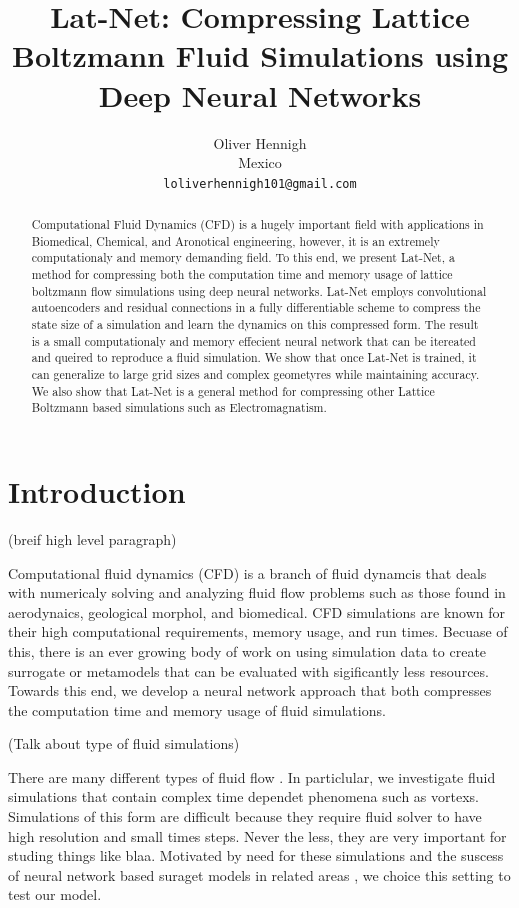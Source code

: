 \documentclass{article}
\title{Lat-Net: Compressing Lattice Boltzmann Fluid Simulations using Deep Neural Networks}
\author{
  Oliver Hennigh \\
  Mexico \\
  \texttt{loliverhennigh101@gmail.com} \\
}
\begin{document}

\maketitle

\begin{abstract}
Computational Fluid Dynamics (CFD) is a hugely important field with applications in Biomedical, Chemical, and Aronotical engineering, however, it is an extremely computationaly and memory demanding field. To this end, we present Lat-Net, a method for compressing both the computation time and memory usage of lattice boltzmann flow simulations using deep neural networks. Lat-Net employs convolutional autoencoders and residual connections in a fully differentiable scheme to compress the state size of a simulation and learn the dynamics on this compressed form. The result is a small computationaly and memory effecient neural network that can be itereated and queired to reproduce a fluid simulation. We show that once Lat-Net is trained, it can generalize to large grid sizes and complex geometyres while maintaining accuracy. We also show that Lat-Net is a general method for compressing other Lattice Boltzmann based simulations such as Electromagnatism.

\end{abstract}

\section{Introduction}

(breif high level paragraph)

Computational fluid dynamics (CFD) is a branch of fluid dynamcis that deals with numericaly solving and analyzing fluid flow problems such as those found in aerodynaics, geological morphol, and biomedical. CFD simulations are known for their high computational requirements, memory usage, and run times. Becuase of this, there is an ever growing body of work on using simulation data to create surrogate or metamodels that can be evaluated with sigificantly less resources. Towards this end, we develop a neural network approach that both compresses the computation time and memory usage of fluid simulations.

(Talk about type of fluid simulations)

There are many different types of fluid flow . In particlular, we investigate fluid simulations that contain complex time dependet phenomena such as vortexs. Simulations of this form are difficult because they require fluid solver to have high resolution and small times steps. Never the less, they are very important for studing things like blaa. Motivated by need for these simulations and the suscess of neural network based suraget models in related areas \cite{tompson2016accelerating} \cite{guo2016convolutional}, we choice this setting to test our model.
\end{document}
